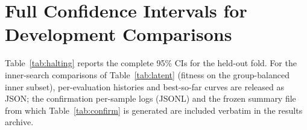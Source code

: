 \documentclass[11pt]{article}
\begin{document}
\section{Full Confidence Intervals for Development Comparisons}
Table~\ref{tab:halting} reports the complete 95\% CIs for the held-out fold. For the inner-search comparisons of Table~\ref{tab:latent} (fitness on the group-balanced inner subset), per-evaluation histories and best-so-far curves are released as JSON; the confirmation per-sample logs (JSONL) and the frozen summary file from which Table~\ref{tab:confirm} is generated are included verbatim in the results archive.
\end{document}
